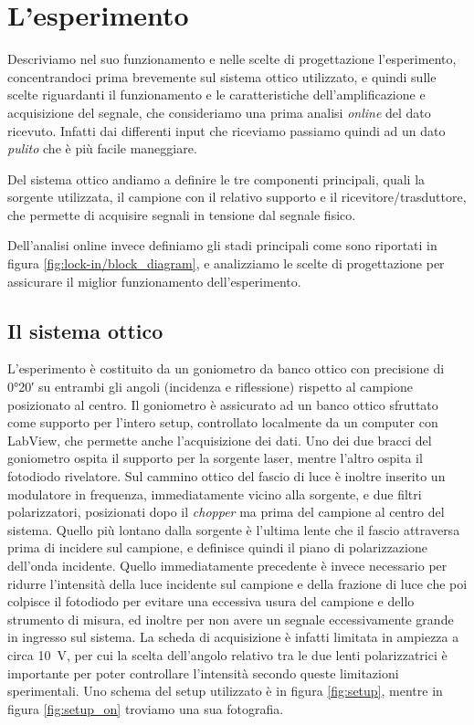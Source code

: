 \documentclass[prb,showpacs,floatfix,altaffilletter,amsmath,amssymb,reprint,citeautoscript,showkeys]{revtex4-1}
\begin{document}
\section{L'esperimento}

Descriviamo nel suo funzionamento e nelle scelte di progettazione l'esperimento, concentrandoci prima brevemente sul sistema ottico utilizzato, e quindi sulle scelte riguardanti il funzionamento e le caratteristiche dell'amplificazione e acquisizione del segnale, che consideriamo una prima analisi \emph{online} del dato ricevuto. Infatti dai differenti input che riceviamo passiamo quindi ad un dato \emph{pulito} che è più facile maneggiare. 

Del sistema ottico andiamo a definire le tre componenti principali, quali la sorgente utilizzata, il campione con il relativo supporto e il ricevitore/trasduttore, che permette di acquisire segnali in tensione dal segnale fisico. 

Dell'analisi online invece definiamo gli stadi principali come sono riportati in figura \ref{fig:lock-in/block_diagram}, e analizziamo le scelte di progettazione per assicurare il miglior funzionamento dell'esperimento. 

\subsection{Il sistema ottico}

L'esperimento è costituito da un goniometro da banco ottico con precisione di \ang{0;20} su entrambi gli angoli (incidenza e riflessione) rispetto al campione posizionato al centro. Il goniometro è assicurato ad un banco ottico sfruttato come supporto per l'intero setup, controllato localmente da un computer con LabView, che permette anche l'acquisizione dei dati. Uno dei due bracci del goniometro ospita il supporto per la sorgente laser, mentre l'altro ospita il fotodiodo rivelatore. Sul cammino ottico del fascio di luce è inoltre inserito un modulatore in frequenza, immediatamente vicino alla sorgente, e due filtri polarizzatori, posizionati dopo il \emph{chopper} ma prima del campione al centro del sistema. Quello più lontano dalla sorgente è l'ultima lente che il fascio attraversa prima di incidere sul campione, e definisce quindi il piano di polarizzazione dell'onda incidente. Quello immediatamente precedente è invece necessario per ridurre l'intensità della luce incidente sul campione e della frazione di luce che poi colpisce il fotodiodo per evitare una eccessiva usura del campione e dello strumento di misura, ed inoltre per non avere un segnale eccessivamente grande in ingresso sul sistema. La scheda di acquisizione è infatti limitata in ampiezza a circa \SI{10}{\volt}, per cui la scelta dell'angolo relativo tra le due lenti polarizzatrici è importante per poter controllare l'intensità secondo queste limitazioni sperimentali. Uno schema del setup utilizzato è in figura \ref{fig:setup}, mentre in figura \ref{fig:setup_on} troviamo una sua fotografia. 
\end{document}

